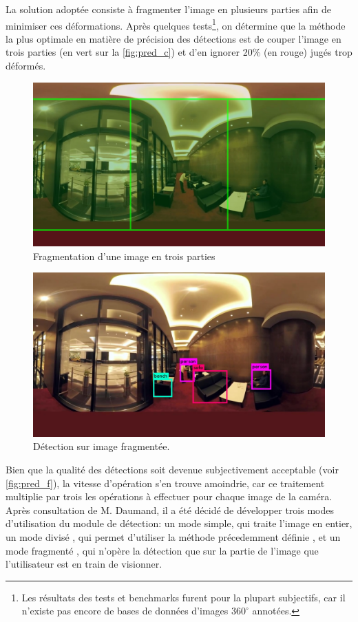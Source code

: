 			La solution adoptée consiste à fragmenter l'image en plusieurs parties afin de minimiser ces déformations. Après quelques tests\footnote{Les résultats des tests et benchmarks furent pour la plupart subjectifs, car il n'existe pas encore de bases de données d'images $360^{\circ}$ annotées.}, on détermine que la méthode la plus optimale en matière de précision des détections est de couper l'image en trois parties (en vert sur la \autoref{fig:pred_c}) et d'en ignorer 20\% (en rouge) jugés trop déformés.
			
			\begin{figure}[H]
			{
				\centering
				\includegraphics[width=.8\textwidth]{figures/predictions_cut.jpg}
				\caption{Fragmentation d'une image en trois parties}
				\label{fig:pred_c}
			}
			\end{figure}
			\begin{figure}[H]
			{
				\centering
				\includegraphics[width=.8\textwidth]{figures/predictions_f.jpg}
				\caption{Détection sur image fragmentée.}
				\label{fig:pred_f}
			}
			\end{figure}
			
			Bien que la qualité des détections soit devenue subjectivement acceptable (voir \autoref{fig:pred_f}), la vitesse d'opération s'en trouve amoindrie, car ce traitement multiplie par trois les opérations à effectuer pour chaque image de la caméra.
			Après consultation de M. Daumand, il a été décidé de développer trois modes d'utilisation du module de détection: un mode simple, qui traite l'image en entier, un mode \og divisé \fg{}, qui permet d'utiliser la méthode précedemment définie
			, et un mode \og fragmenté \fg{}, qui n'opère la détection que sur la partie de l'image que l'utilisateur est en train de visionner.


